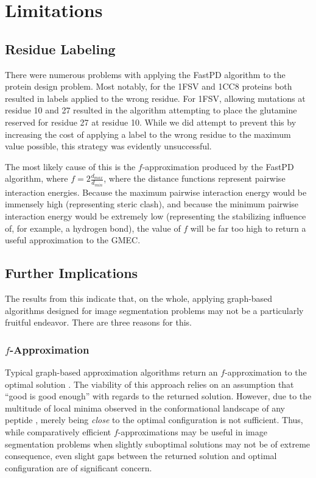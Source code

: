 \documentclass[11pt]{article}
\begin{document}
	\section{Limitations}
	
	\subsection{Residue Labeling}
	There were numerous problems with applying the FastPD algorithm to the protein
	design problem. Most notably, for the 1FSV and 1CC8 proteins both resulted in
	labels applied to the wrong residue. For 1FSV, allowing mutations at residue
	10 and 27 resulted in the algorithm attempting to place the glutamine reserved
	for residue 27 at residue 10. While we did attempt to prevent this by increasing
	the cost of applying a label to the wrong residue to the maximum value possible,
	this strategy was evidently unsuccessful. 
	
	The most likely cause of this is the $f$-approximation produced by the FastPD
	algorithm, where $f = 2 \frac{d_{max}}{d_{min}}$, where the distance functions
	represent pairwise interaction energies. Because the maximum pairwise interaction
	energy would be immensely high (representing steric clash), and because the
	minimum pairwise interaction energy would be extremely low (representing the 
	stabilizing influence of, for example, a hydrogen bond), the value of $f$ will
	be far too high to return a useful approximation to the GMEC. 
	
	\subsection{Further Implications}
	The results from this indicate that, on the whole, applying graph-based algorithms
	designed for image segmentation problems may not be a particularly fruitful
	endeavor. There are three reasons for this. 
	
	\subsubsection{$f$-Approximation}
	Typical graph-based approximation algorithms return an $f$-approximation to
	the optimal solution \cite{CKNZ}. The viability of this approach relies
	on an assumption that ``good is good enough'' with regards to the returned
	solution.  However, due to the multitude of local minima observed in the
	conformational landscape of any peptide \cite{DCM0}, merely being \textit{close}
	to the optimal configuration is not sufficient. Thus, while comparatively
	efficient $f$-approximations may be useful in image segmentation problems 
	when slightly suboptimal solutions may not be of extreme consequence, even
	slight gaps between the returned solution and optimal configuration are of
	significant concern. 
	
\end{document}
